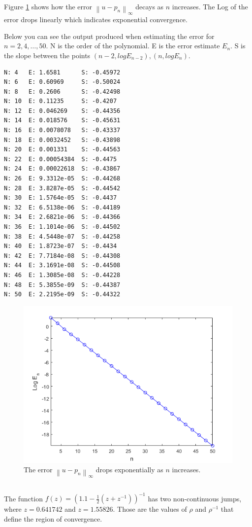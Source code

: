 \documentclass[12pt]{article}
\newcommand{\norm}[1]{\left\lVert#1\right\rVert}
\begin{document}
Figure \ref{fig_pt_log_err} shows how the error $\norm{u-p_n}_{\infty}$ decays as $n$ increases. The Log of the error drops linearly which indicates exponential convergence.

Below you can see the output produced when estimating the error for $n = 2, 4, \ldots, 50$.
N is the order of the polynomial. E is the error estimate $E_n$. S is the slope between 
the points $(n-2, log E_{n-2}), (n, log E_n)$.

\begin{minipage}{\linewidth}
\begin{lstlisting}
N: 4   E: 1.6581      S: -0.45972
N: 6   E: 0.60969     S: -0.50024
N: 8   E: 0.2606      S: -0.42498
N: 10  E: 0.11235     S: -0.4207
N: 12  E: 0.046269    S: -0.44356
N: 14  E: 0.018576    S: -0.45631
N: 16  E: 0.0078078   S: -0.43337
N: 18  E: 0.0032452   S: -0.43898
N: 20  E: 0.001331    S: -0.44563
N: 22  E: 0.00054384  S: -0.4475
N: 24  E: 0.00022618  S: -0.43867
N: 26  E: 9.3312e-05  S: -0.44268
N: 28  E: 3.8287e-05  S: -0.44542
N: 30  E: 1.5764e-05  S: -0.4437
N: 32  E: 6.5138e-06  S: -0.44189
N: 34  E: 2.6821e-06  S: -0.44366
N: 36  E: 1.1014e-06  S: -0.44502
N: 38  E: 4.5448e-07  S: -0.44258
N: 40  E: 1.8723e-07  S: -0.4434
N: 42  E: 7.7184e-08  S: -0.44308
N: 44  E: 3.1691e-08  S: -0.44508
N: 46  E: 1.3085e-08  S: -0.44228
N: 48  E: 5.3855e-09  S: -0.44387
N: 50  E: 2.2195e-09  S: -0.44322
\end{lstlisting}
\end{minipage}

\begin{figure}
    \includegraphics[width=.6\linewidth]{pt_log_err}
    \centering
    \caption{The error $\norm{u-p_n}_{\infty}$ drops exponentially as $n$ increases.}
    \label{fig_pt_log_err}
\end{figure}


\subsection{} %
The function $f(z) = (1.1 - \frac{1}{2}(z + z^{-1}))^{-1}$ has two non-continuous jumps, where $z = 0.641742$ and $z = 1.55826$. Those are the values of $\rho$ and $\rho^{-1}$ that define the region of convergence.
\end{document}
